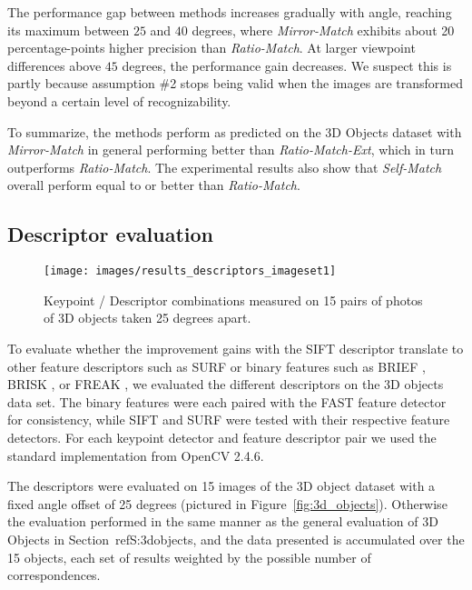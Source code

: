 \documentclass[10pt,journal,cspaper,compsoc]{IEEEtran}
\begin{document}
The performance gap between methods increases gradually with angle, reaching its maximum between $25$ and $40$ degrees, 
where \emph{Mirror-Match} exhibits about 20 percentage-points higher precision than \emph{Ratio-Match}. 
At larger viewpoint differences above $45$ degrees, the performance gain decreases.  We suspect this is partly because assumption \#2 stops being valid when the images are transformed beyond 
a certain level of recognizability.

To summarize, the methods perform as predicted on the 3D Objects dataset
with \emph{Mirror-Match} in general performing better than 
\emph{Ratio-Match-Ext}, which in turn outperforms
\emph{Ratio-Match}. The experimental results also show that 
\emph{Self-Match} overall perform equal to or better than 
\emph{Ratio-Match}.

\subsection{Descriptor evaluation}
\label{label:desc}

\begin{figure*}[t]
    \centering
    \texttt{[image: images/results\_descriptors\_imageset1]}
    \caption{Keypoint / Descriptor combinations measured on 15 pairs of 
    photos of 3D objects taken 25 degrees apart.}
    \label{fig:descriptors}
\end{figure*}

To evaluate whether the improvement gains with the SIFT descriptor 
translate to other feature descriptors such as SURF \cite{bay2006surf} 
or binary features such as BRIEF \cite{calonder2010brief}, BRISK 
\cite{leutenegger2011brisk}, or FREAK \cite{alahi2012freak}, we evaluated 
the different descriptors on the 3D objects data set.  The binary 
features were each paired with the FAST feature detector for 
consistency, while SIFT and SURF were tested with their respective 
feature detectors.  For each keypoint detector and feature descriptor 
pair we used the standard implementation from OpenCV 2.4.6.

The descriptors were evaluated on 15 images of the 3D object dataset 
with a fixed angle offset of 25 degrees (pictured in 
Figure~\ref{fig:3d_objects}).  Otherwise the evaluation performed in the same manner as the general evaluation of 3D Objects in Section~ref{S:3dobjects}, and the data presented is 
accumulated over the 15 objects, each set of results weighted by the 
possible number of correspondences.
\end{document}
